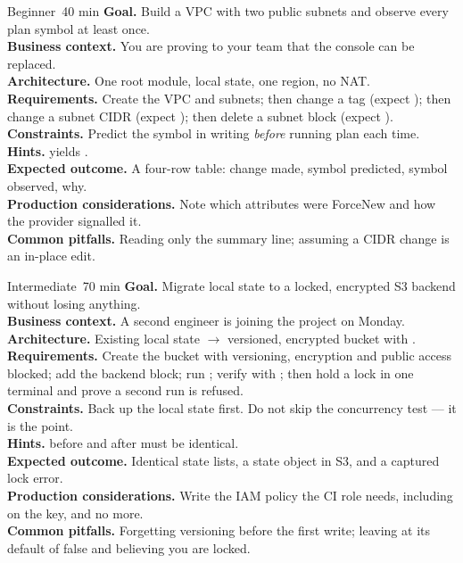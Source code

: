 
\begin{minilab}{Beginner}{~40 min}
\textbf{Goal.} Build a VPC with two public subnets and observe every plan symbol at least once.\\
\textbf{Business context.} You are proving to your team that the console can be replaced.\\
\textbf{Architecture.} One root module, local state, one region, no NAT.\\
\textbf{Requirements.} Create the VPC and subnets; then change a tag (expect \code{\textasciitilde{}}); then change a subnet CIDR (expect \code{-/+}); then delete a subnet block (expect \code{-}).\\
\textbf{Constraints.} Predict the symbol in writing \emph{before} running plan each time.\\
\textbf{Hints.}  yields .\\
\textbf{Expected outcome.} A four-row table: change made, symbol predicted, symbol observed, why.\\
\textbf{Production considerations.} Note which attributes were ForceNew and how the provider signalled it.\\
\textbf{Common pitfalls.} Reading only the summary line; assuming a CIDR change is an in-place edit.
\end{minilab}

\begin{minilab}{Intermediate}{~70 min}
\textbf{Goal.} Migrate local state to a locked, encrypted S3 backend without losing anything.\\
\textbf{Business context.} A second engineer is joining the project on Monday.\\
\textbf{Architecture.} Existing local state $\rightarrow$ versioned, encrypted bucket with .\\
\textbf{Requirements.} Create the bucket with versioning, encryption and public access blocked; add the backend block; run ; verify with ; then hold a lock in one terminal and prove a second run is refused.\\
\textbf{Constraints.} Back up the local state first. Do not skip the concurrency test --- it is the point.\\
\textbf{Hints.}  before and after must be identical.\\
\textbf{Expected outcome.} Identical state lists, a state object in S3, and a captured lock error.\\
\textbf{Production considerations.} Write the IAM policy the CI role needs, including  on the  key, and no more.\\
\textbf{Common pitfalls.} Forgetting versioning before the first write; leaving  at its default of false and believing you are locked.
\end{minilab}

